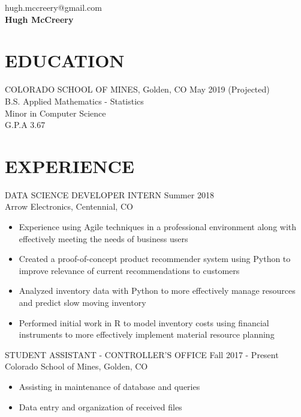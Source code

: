 \documentclass[11pt]{res} %
\begin{document}
 
\begin{multicols}{3}
\noindent \raggedright{hugh.mccreery@gmail.com}\\ \textbf{\LARGE Hugh McCreery}\\ 
\end{multicols}
\vspace{-0.4in}
\begin{resume}
\vspace{-0.2in}
\hrulefill
\vspace{-0.2in}                                  
\section{EDUCATION} 
 \noindent COLORADO SCHOOL OF MINES, Golden, CO \hfill May 2019 (Projected) \\
B.S. Applied Mathematics - Statistics	\\
Minor in Computer Science	\\
G.P.A 3.67	\\
\vspace{-0.1in}
\hrulefill
\vspace{-0.1in}  
\section{EXPERIENCE} 
DATA SCIENCE DEVELOPER INTERN \hfill Summer 2018 \\
Arrow Electronics, Centennial, CO

\begin{itemize}
	\item Experience using Agile techniques in a professional environment along with effectively meeting the needs of business users
	\item Created a proof-of-concept product recommender system using Python to improve relevance of current recommendations to customers
	\item Analyzed inventory data with Python to more effectively manage resources and predict slow moving inventory
	\item Performed initial work in R to model inventory costs using financial instruments to more effectively implement material resource planning
\end{itemize}
\vspace{-0.15in}  
STUDENT ASSISTANT - CONTROLLER'S OFFICE \hfill Fall 2017 - Present\ \\
Colorado School of Mines, Golden, CO 

\begin{itemize} 
	\item Assisting in maintenance of database and queries
	\item Data entry and organization of received files
\end{itemize}


\end{resume}
\end{document}
